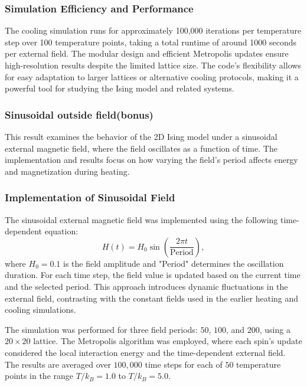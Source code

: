 \documentclass[11pt]{article}
\begin{document}
\subsubsection*{Simulation Efficiency and Performance}
The cooling simulation runs for approximately 100,000 iterations per temperature step over 100 temperature points, taking a total runtime of around 1000 seconds per external field. The modular design and efficient Metropolis updates ensure high-resolution results despite the limited lattice size. The code's flexibility allows for easy adaptation to larger lattices or alternative cooling protocols, making it a powerful tool for studying the Ising model and related systems.

\subsubsection{Sinusoidal outside field(bonus)}

 This result examines the behavior of the 2D Ising model under a sinusoidal external magnetic field, where the field oscillates as a function of time. The implementation and results focus on how varying the field's period affects energy and magnetization during heating.

\subsubsection*{Implementation of Sinusoidal Field}
The sinusoidal external magnetic field was implemented using the following time-dependent equation:
\begin{equation}
H(t) = H_0 \sin\left(\frac{2 \pi t}{\text{Period}}\right),
\end{equation}
where \(H_0 = 0.1\) is the field amplitude and "Period" determines the oscillation duration. For each time step, the field value is updated based on the current time and the selected period. This approach introduces dynamic fluctuations in the external field, contrasting with the constant fields used in the earlier heating and cooling simulations.

The simulation was performed for three field periods: \(50\), \(100\), and \(200\), using a \(20 \times 20\) lattice. The Metropolis algorithm was employed, where each spin's update considered the local interaction energy and the time-dependent external field. The results are averaged over \(100,000\) time steps for each of \(50\) temperature points in the range \(T / k_B = 1.0\) to \(T / k_B = 5.0\).
\end{document}
